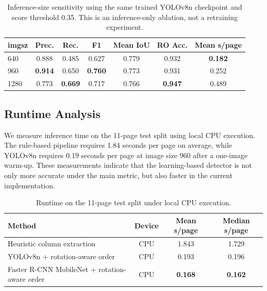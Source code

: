 \documentclass[pdflatex,sn-mathphys-num]{sn-jnl}
\begin{document}
\begin{table}
\centering
\scriptsize\setlength{\tabcolsep}{3pt}
\caption{Inference-size sensitivity using the same trained YOLOv8n checkpoint and score threshold 0.35. This is an inference-only ablation, not a retraining experiment.}
\label{tab:imgsz_ablation}
\begin{tabular}{lcccccc}
\toprule
imgsz & Prec. & Rec. & F1 & Mean IoU & RO Acc. & Mean s/page \\
\midrule
640 & 0.888 & 0.485 & 0.627 & 0.779 & 0.932 & \textbf{0.182} \\
960 & \textbf{0.914} & 0.650 & \textbf{0.760} & 0.773 & 0.931 & 0.252 \\
1280 & 0.773 & \textbf{0.669} & 0.717 & 0.766 & \textbf{0.947} & 0.489 \\
\bottomrule
\end{tabular}
\end{table}

\subsection{Runtime Analysis}
We measure inference time on the 11-page test split using local CPU execution. The rule-based pipeline requires 1.84 seconds per page on average, while YOLOv8n requires 0.19 seconds per page at image size 960 after a one-image warm-up. These measurements indicate that the learning-based detector is not only more accurate under the main metric, but also faster in the current implementation.

\begin{table}[t]
\centering
\scriptsize\setlength{\tabcolsep}{3pt}
\caption{Runtime on the 11-page test split under local CPU execution.}
\label{tab:runtime}
\begin{tabular}{lccc}
\toprule
Method & Device & Mean s/page & Median s/page \\
\midrule
Heuristic column extraction & CPU & 1.843 & 1.729 \\
YOLOv8n + rotation-aware order & CPU & 0.193 & 0.196 \\
Faster R-CNN MobileNet + rotation-aware order & CPU & \textbf{0.168} & \textbf{0.162} \\
\bottomrule
\end{tabular}
\end{table}
\end{document}
